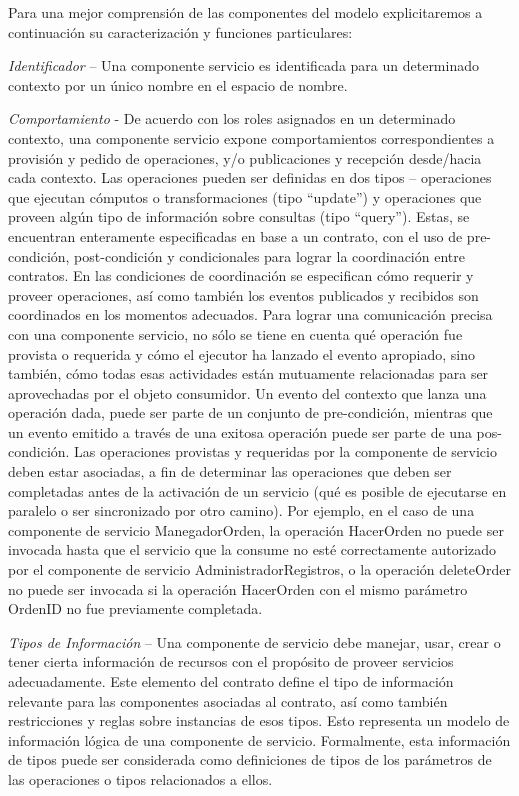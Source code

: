 \documentclass{llncs}
\begin{document}
Para una mejor comprensión de las componentes del modelo explicitaremos a continuación su caracterización y funciones particulares: 

\textit{Identificador} – Una componente servicio es identificada para un determinado contexto por un único nombre en el espacio de nombre.

\textit{Comportamiento} -  De acuerdo con los roles asignados en un determinado contexto, una componente servicio expone comportamientos correspondientes a provisión y pedido de operaciones, y/o publicaciones y recepción  desde/hacia cada contexto. Las operaciones pueden ser definidas en dos tipos – operaciones que ejecutan cómputos o transformaciones (tipo “update”) y operaciones que proveen algún tipo de información sobre consultas  (tipo “query”). Estas, se encuentran enteramente especificadas en base a  un contrato, con el uso de pre-condición, post-condición y condicionales para lograr la coordinación entre contratos. En las condiciones de coordinación se especifican cómo requerir y proveer operaciones, así como también los eventos publicados  y recibidos son coordinados en los momentos adecuados. Para lograr una comunicación precisa con una componente servicio, no sólo se tiene en cuenta qué operación fue provista o requerida y cómo el ejecutor ha lanzado el evento apropiado, sino también, cómo todas esas actividades están mutuamente relacionadas para ser aprovechadas por el objeto consumidor. Un evento del contexto que lanza una operación dada, puede ser parte de un conjunto de pre-condición, mientras que un evento emitido a través de una exitosa operación puede ser parte de una pos-condición. 
Las operaciones provistas y requeridas por la componente de servicio deben estar asociadas, a fin de determinar las operaciones que deben ser completadas antes de la activación de un servicio (qué es posible de ejecutarse en paralelo o ser sincronizado por otro camino). Por ejemplo, en el caso de una componente de servicio ManegadorOrden, la operación HacerOrden no puede ser invocada hasta que el servicio que la consume no esté correctamente autorizado por el componente de servicio AdministradorRegistros, o la operación deleteOrder no puede ser invocada si la operación HacerOrden con el mismo parámetro OrdenID no fue previamente completada.

\textit{Tipos de Información} –  Una componente de servicio debe  manejar, usar,  crear o tener cierta información de recursos con el propósito de proveer servicios adecuadamente.  Este elemento del contrato define el tipo de información relevante para las componentes  asociadas al contrato, así como también restricciones y reglas sobre instancias de esos tipos. Esto representa un modelo de información lógica de una componente de servicio. Formalmente, esta información de tipos puede ser considerada como definiciones de tipos de  los parámetros de las operaciones o tipos relacionados a ellos.
\end{document}
